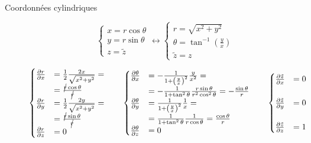 \documentclass
[
a4paper,                      %
twoside,					  %
12pt,                         %
abstract,		      %
fleqn,                        %
]
{scrartcl} %
\begin{document}
\begin{description}
\newpage

\item[Coordonn\'ees cylindriques]

\begin{equation}
\begin{cases}
x=r\cos{\theta}\\
y=r\sin{\theta}\\
z=\tilde{z}
\end{cases}\longleftrightarrow\begin{cases}
r=\sqrt{x^{2}+y^{2}}\\
\theta=\tan^{-1}\left(\frac{y}{x}\right)\\
\tilde{z}=z
\end{cases}
\end{equation}

\begin{equation}
\begin{cases}
\frac{\partial r}{\partial x}&=\frac{1}{2}\frac{2x}{\sqrt{x^{2}+y^{2}}}=\\&=\frac{\cancel{r}\cos{\theta}}{\cancel{r}}\\
\frac{\partial r}{\partial y}&=\frac{1}{2}\frac{2y}{\sqrt{x^{2}+y^{2}}}=\\&=\frac{\cancel{r}\sin{\theta}}{\cancel{r}}\\
\frac{\partial r}{\partial z}&=0\\
\end{cases}\qquad\begin{cases}
\frac{\partial \theta}{\partial x}&=-\frac{1}{1+\left(\frac{y}{x}\right)^{2}}\frac{y}{x^{2}}=\\&=-\frac{1}{1+\tan^{2}{\theta}}\frac{r\sin{\theta}}{r^{2}\cos^{2}{\theta}}=-\frac{\sin{\theta}}{r}\\
\frac{\partial \theta}{\partial y}&=\frac{1}{1+\left(\frac{y}{x}\right)^{2}}\frac{1}{x}=\\&=\frac{1}{1+\tan^{2}{\theta}}\frac{1}{r\cos{\theta}}=\frac{\cos{\theta}}{r}\\
\frac{\partial \theta}{\partial z}&=0\\
\end{cases}\qquad\begin{cases}
\frac{\partial \tilde{z}}{\partial x}&=0\\&\\
\frac{\partial \tilde{z}}{\partial y}&=0\\&\\
\frac{\partial \tilde{z}}{\partial z}&=1\\
\end{cases}
\end{equation}


\end{description}
\end{document}
